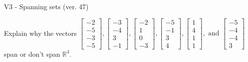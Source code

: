 \begin{exercise}
  \begin{exerciseTitle}V3 - Spanning sets (ver. 47)\end{exerciseTitle}
  \begin{exerciseStatement}
    Explain why the vectors \(\left[\begin{array}{r}
-2 \\
-5 \\
-3 \\
-5
\end{array}\right] , \left[\begin{array}{r}
-3 \\
-4 \\
3 \\
-1
\end{array}\right] , \left[\begin{array}{r}
-2 \\
1 \\
0 \\
-3
\end{array}\right] , \left[\begin{array}{r}
-5 \\
-1 \\
3 \\
4
\end{array}\right] , \left[\begin{array}{r}
1 \\
4 \\
1 \\
1
\end{array}\right] , \text{ and } \left[\begin{array}{r}
-5 \\
-4 \\
-4 \\
3
\end{array}\right]\) span or don't span \(\mathbb{R}^4\). 
	



\end{exerciseStatement}
\end{exercise}
